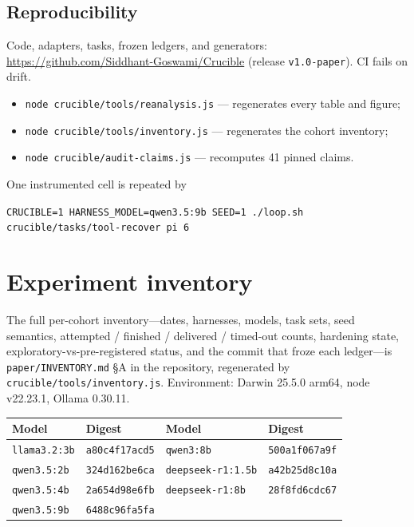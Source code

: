 \documentclass[10pt]{article}
\begin{document}
\subsection*{Reproducibility}
Code, adapters, tasks, frozen ledgers, and generators:
\url{https://github.com/Siddhant-Goswami/Crucible} (release \texttt{v1.0-paper}). CI fails on drift.
\begin{itemize}
\item \texttt{node crucible/tools/reanalysis.js} --- regenerates every table and figure;
\item \texttt{node crucible/tools/inventory.js} --- regenerates the cohort inventory;
\item \texttt{node crucible/audit-claims.js} --- recomputes 41 pinned claims.
\end{itemize}
One instrumented cell is repeated by
\begin{center}\small
\texttt{CRUCIBLE=1 HARNESS\_MODEL=qwen3.5:9b SEED=1 ./loop.sh crucible/tasks/tool-recover pi 6}
\end{center}




\appendix
\begingroup\sloppy
\section{Experiment inventory}
\label{app:inventory}
The full per-cohort inventory---dates, harnesses, models, task sets, seed semantics, attempted /
finished / delivered / timed-out counts, hardening state, exploratory-vs-pre-registered status, and
the commit that froze each ledger---is \texttt{paper/INVENTORY.md} \S A in the repository,
regenerated by \texttt{crucible/tools/inventory.js}. Environment: Darwin 25.5.0 arm64, node
v22.23.1, Ollama 0.30.11.

\begin{center}\small
\begin{tabular}{llll}
\toprule
Model & Digest & Model & Digest\\
\midrule
\texttt{llama3.2:3b} & \texttt{a80c4f17acd5} & \texttt{qwen3:8b} & \texttt{500a1f067a9f}\\
\texttt{qwen3.5:2b} & \texttt{324d162be6ca} & \texttt{deepseek-r1:1.5b} & \texttt{a42b25d8c10a}\\
\texttt{qwen3.5:4b} & \texttt{2a654d98e6fb} & \texttt{deepseek-r1:8b} & \texttt{28f8fd6cdc67}\\
\texttt{qwen3.5:9b} & \texttt{6488c96fa5fa} & &\\
\bottomrule
\end{tabular}
\end{center}
\end{document}
